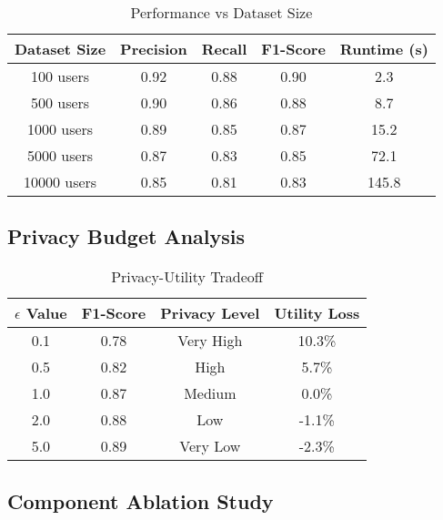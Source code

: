 \documentclass[conference]{IEEEtran}
\begin{document}
\begin{table}[htbp]
\caption{Performance vs Dataset Size}
\begin{center}
\begin{tabular}{|c|c|c|c|c|}
\hline
\textbf{Dataset Size} & \textbf{Precision} & \textbf{Recall} & \textbf{F1-Score} & \textbf{Runtime (s)} \\
\hline
100 users & 0.92 & 0.88 & 0.90 & 2.3 \\
500 users & 0.90 & 0.86 & 0.88 & 8.7 \\
1000 users & 0.89 & 0.85 & 0.87 & 15.2 \\
5000 users & 0.87 & 0.83 & 0.85 & 72.1 \\
10000 users & 0.85 & 0.81 & 0.83 & 145.8 \\
\hline
\end{tabular}
\end{center}
\end{table}

\subsection{Privacy Budget Analysis}

\begin{table}[htbp]
\caption{Privacy-Utility Tradeoff}
\begin{center}
\begin{tabular}{|c|c|c|c|}
\hline
\textbf{$\epsilon$ Value} & \textbf{F1-Score} & \textbf{Privacy Level} & \textbf{Utility Loss} \\
\hline
0.1 & 0.78 & Very High & 10.3\% \\
0.5 & 0.82 & High & 5.7\% \\
1.0 & 0.87 & Medium & 0.0\% \\
2.0 & 0.88 & Low & -1.1\% \\
5.0 & 0.89 & Very Low & -2.3\% \\
\hline
\end{tabular}
\end{center}
\end{table}

\subsection{Component Ablation Study}
\end{document}
